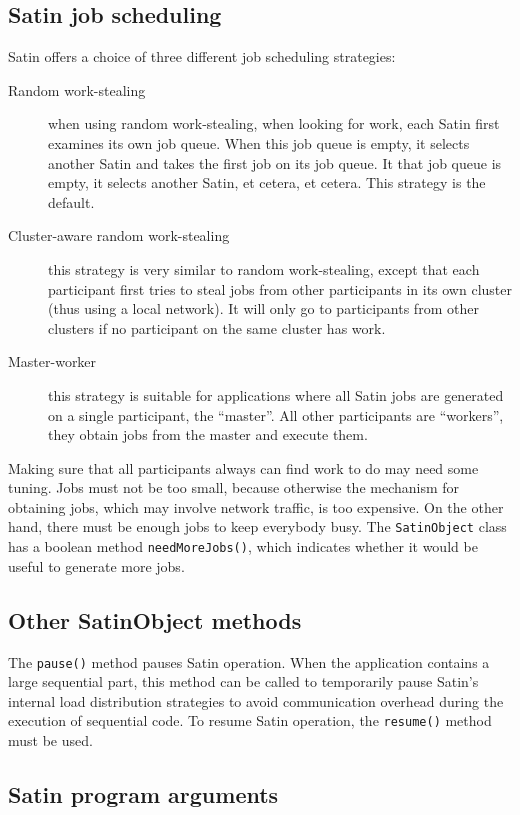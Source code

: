 \documentclass[10pt]{article}
\newcommand{\mysubsection}[1]{\subsection{#1}\label{#1}}
\begin{document}
\mysubsection{Satin job scheduling}

Satin offers a choice of three different job scheduling strategies:
\begin{description}
\item[Random work-stealing]
when using random work-stealing, when looking for work, each Satin
first examines its own job queue. When this job queue is empty,
it selects another Satin and takes the first job on its job queue.
It that job queue is empty, it selects another Satin, et cetera, et cetera.
This strategy is the default.
\item[Cluster-aware random work-stealing]
this strategy is very similar to random work-stealing, except that
each participant first tries to steal jobs from other participants in its
own cluster (thus using a local network). It will only go to participants
from other clusters if no participant on the same cluster has work.
\item[Master-worker]
this strategy is suitable for applications where all Satin jobs are
generated on a single participant, the ``master''. All other participants
are ``workers'', they obtain jobs from the master and execute them.
\end{description}

Making sure that all participants always can find work to do may need
some tuning. Jobs must not be too small, because otherwise the mechanism
for obtaining jobs, which may involve network traffic, is too expensive.
On the other hand, there must be enough jobs to keep everybody busy.
The \verb+SatinObject+ class has a boolean method \verb+needMoreJobs()+,
which indicates whether it would be useful to generate more jobs.

\mysubsection{Other SatinObject methods}

The \verb+pause()+ method pauses Satin operation. When the application
contains a large sequential part, this method can be called to temporarily
pause Satin's internal load distribution strategies to avoid communication
overhead during the execution of sequential code.
To resume Satin operation, the \verb+resume()+ method must be used.

\mysubsection{Satin program arguments}
\end{document}
